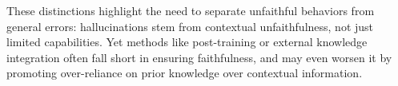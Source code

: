 

These distinctions highlight the need to separate unfaithful behaviors from general errors: hallucinations stem from contextual unfaithfulness, not just limited capabilities. Yet methods like post-training or external knowledge integration often fall short in ensuring faithfulness, and may even worsen it by promoting over-reliance on prior knowledge over contextual information.



